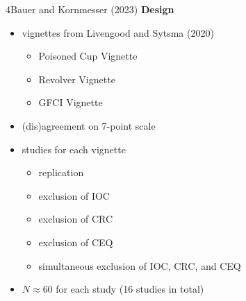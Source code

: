 \documentclass[xcolor=table,9pt,aspectratio=169]{beamer}
\begin{document}
\begin{frame}{\vspace*{10mm}4\hspace*{1em}Bauer and Kornmesser (2023)}
\vspace*{-5mm}
\textbf{Design}\\
\begin{itemize}
   \item vignettes from Livengood and Sytsma (2020)
      \begin{itemize}
         \item Poisoned Cup Vignette
         \item Revolver Vignette
         \item GFCI Vignette
      \end{itemize}
   \item (dis)agreement on 7-point scale
   \item studies for each vignette
      \begin{itemize}
         \item replication
         \item exclusion of IOC
         \item exclusion of CRC
         \item exclusion of CEQ
         \item simultaneous exclusion of IOC, CRC, and CEQ
      \end{itemize}
   \item $N\approx 60$ for each study (16 studies in total)
\end{itemize}
\vfill
{}
\end{frame}
\end{document}
